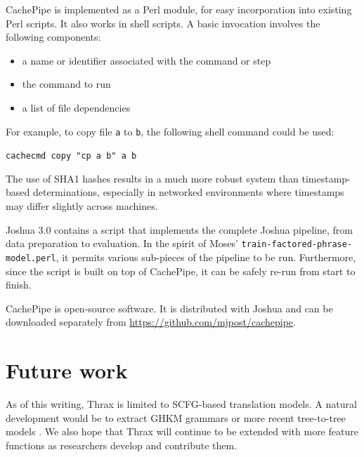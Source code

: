 \documentclass[11pt]{article}
\begin{document}
CachePipe is implemented as a Perl module, for easy incorporation into
existing Perl scripts.  It also works in shell scripts.  A basic
invocation involves the following components:

\begin{itemize}
\item a name or identifier associated with the command or step
\item the command to run
\item a list of file dependencies
\end{itemize}

\noindent For example, to copy file \verb|a| to \verb|b|, the
following shell command could be used:

\verb|cachecmd copy "cp a b" a b|

\noindent The use of SHA1 hashes results in a much more robust system than
timestamp-based determinations, especially in networked environments
where timestamps may differ slightly across machines.

Joshua 3.0 contains a script that implements the complete Joshua
pipeline, from data preparation to evaluation.  In the spirit of
Moses' \verb|train-factored-phrase-model.perl|, it permits various
sub-pieces of the pipeline to be run.  Furthermore, since the script
is built on top of CachePipe, it can be safely re-run from start to finish.

CachePipe is open-source software.  It is distributed with Joshua and
can be downloaded separately from \url{https://github.com/mjpost/cachepipe}.

\section{Future work}

As of this writing, Thrax is limited to SCFG-based translation models.
A natural development would be to extract GHKM grammars
\cite{galley2004whats} or more recent tree-to-tree models
\cite{zhang2008,liu2009,chiang2010}.  We also hope that Thrax will
continue to be extended with more feature functions as researchers
develop and contribute them.




\end{document}
